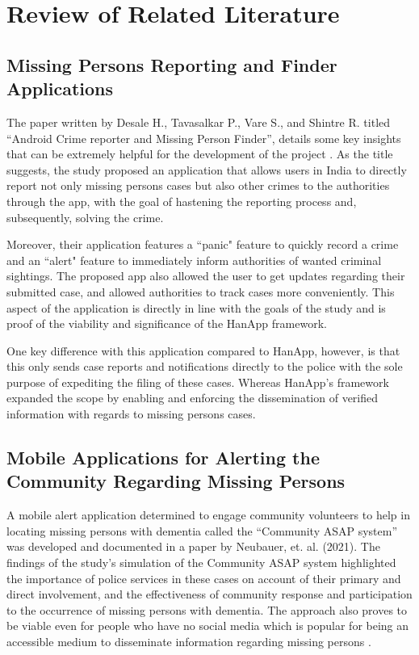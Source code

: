 \chapter{Review of Related Literature}
\label{sec:relatedlit}

\section{Missing Persons Reporting and Finder Applications}

The paper written by Desale H., Tavasalkar P., Vare S., and Shintre R. titled “Android Crime reporter and Missing Person Finder”, details some key insights that can be extremely helpful for the development of the project \cite{desale2020android}. As the title suggests, the study proposed an application that allows users in India to directly report not only missing persons cases but also other crimes to the authorities through the app, with the goal of hastening the reporting process and, subsequently, solving the crime. 

Moreover,  their application features a ``panic" feature to quickly record a crime and an ``alert" feature to immediately inform authorities of wanted criminal sightings. The proposed app also allowed the user to get updates regarding their submitted case, and allowed authorities to track cases more conveniently.  This aspect of the application is directly in line with the goals of the study and is proof of the viability and significance of the HanApp framework.

One key difference with this application compared to HanApp, however, is that this only sends case reports and notifications directly to the police with the sole purpose of expediting the filing of these cases. Whereas HanApp's framework expanded the scope by enabling and enforcing the dissemination of verified information with regards to missing persons cases.

\section{Mobile Applications for Alerting the Community Regarding Missing Persons}

A mobile alert application determined to engage community volunteers to help in locating missing persons with dementia called the “Community ASAP system” was developed and documented in a paper by Neubauer, et. al. (2021). The findings of the study’s simulation of the Community ASAP system highlighted the importance of police services in these cases on account of their primary and direct involvement, and the effectiveness of community response and participation to the occurrence of missing persons with dementia. The approach also proves to be viable even for people who have no social media which is popular for being an accessible medium to disseminate information regarding missing persons \cite{neubauer2021mobile}.

